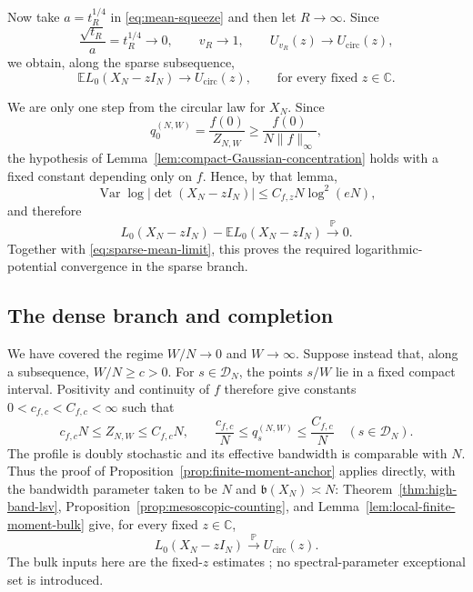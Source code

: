 \documentclass[11pt,reqno]{amsart}
\numberwithin{equation}{section}
\theoremstyle{definition}
\theoremstyle{remark}
\newcommand{\C}{\mathbb C}
\newcommand{\E}{\mathbb E}
\newcommand{\Pp}{\mathbb P}
\newcommand{\1}{\mathbf 1}
\newcommand{\cir}{\mathrm{circ}}
\begin{document}
Now take $a=t_R^{1/4}$ in \eqref{eq:mean-squeeze} and then let
$R\to\infty$.  Since
\[
 \frac{\sqrt{t_R}}a=t_R^{1/4}\to0,\qquad
 v_R\to1,\qquad U_{v_R}(z)\to U_{\cir}(z),
\]
we obtain, along the sparse subsequence,
\begin{equation}\label{eq:sparse-mean-limit}
 \E L_0(X_N-zI_N)\longrightarrow U_{\cir}(z),
 \qquad\text{for every fixed }z\in\C.
\end{equation}


We are only one step from the circular law for $X_N$.
Since
\[
 q_0^{(N,W)}=\frac{f(0)}{Z_{N,W}}
 \geq \frac{f(0)}{N\|f\|_\infty},
\]
the hypothesis of Lemma~\ref{lem:compact-Gaussian-concentration} holds
with a fixed constant depending only on \(f\).  Hence, by that lemma,
\begin{equation}\label{eq:Gaussian-logdet-variance}
 \operatorname{Var}\log|\det(X_N-zI_N)|\le C_{f,z}N\log^2(eN),
\end{equation}
and therefore
\begin{equation}\label{eq:Gaussian-logdet-concentration}
 L_0(X_N-zI_N)-\E L_0(X_N-zI_N)\xrightarrow{\Pp}0.
\end{equation}
Together with \eqref{eq:sparse-mean-limit}, this proves the required
logarithmic-potential convergence in the sparse branch.

\subsection{The dense branch and completion}
We have covered the regime \(W/N\to0\) and \(W\to\infty\).  Suppose
instead that, along a subsequence, \(W/N\geq c>0\).  For
\(s\in\mathcal D_N\), the points \(s/W\) lie in a fixed compact interval.
Positivity and continuity of \(f\) therefore give constants
\(0<c_{f,c}<C_{f,c}<\infty\) such that
\begin{equation}\label{eq:dense-profile-comparability}
 c_{f,c}N\le Z_{N,W}\le C_{f,c}N,\qquad
 \frac{c_{f,c}}N\le q_s^{(N,W)}\le\frac{C_{f,c}}N
 \quad(s\in\mathcal D_N).
\end{equation}
The profile is doubly stochastic and its effective bandwidth is comparable
with \(N\).  Thus the proof of
Proposition~\ref{prop:finite-moment-anchor} applies directly, with the
bandwidth parameter taken to be \(N\) and
\(\mathfrak b(X_N)\asymp N\): Theorem~\ref{thm:high-band-lsv},
Proposition~\ref{prop:mesoscopic-counting}, and
Lemma~\ref{lem:local-finite-moment-bulk} give, for every fixed
\(z\in\C\),
\begin{equation}\label{eq:dense-gaussian-logdet}
 L_0(X_N-zI_N)\xrightarrow{\Pp}U_{\cir}(z).
\end{equation}
The bulk inputs here are the fixed-\(z\) estimates
\cite[Proposition~3.4, Corollary~3.5, and Theorem~3.6]{Han2410}; no
spectral-parameter exceptional set is introduced.
\end{document}

